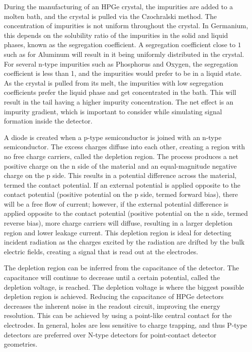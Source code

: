 During the manufacturing of an HPGe crystal, the impurities are added to a molten bath, and the crystal is pulled via the Czochralski method. The concentration of impurities is not uniform throughout the crystal. In Germanium, this depends on the solubility ratio of the impurities in the solid and liquid phases, known as the segregation coefficient. A segregation coefficient close to $1$ such as for Aluminum will result in it being uniformly distributed in the crystal. For several n-type impurities such as Phosphorus and Oxygen, the segregation coefficient is less than 1, and the impurities would prefer to be in a liquid state. As the crystal is pulled from its melt, the impurities with low segregation coefficients prefer the liquid phase and get concentrated in the bath. This will result in the tail having a higher impurity concentration. The net effect is an impurity gradient, which is important to consider while simulating signal formation inside the detector.

A diode is created when a p-type semiconductor is joined with an n-type semiconductor. The excess charges diffuse into each other, creating a region with no free charge carriers, called the depletion region. The process produces a net positive charge on the n side of the material and an equal-magnitude negative charge on the p side. This results in a potential difference across the material, termed the contact potential. If an external potential is applied opposite to the contact potential (positive potential on the p side, termed forward bias), there will be a free flow of current; however, if the external potential difference is applied opposite to the contact potential (positive potential on the n side, termed reverse bias), more charge carriers will diffuse, resulting in a larger depletion region and lower leakage current. This depletion region is ideal for detecting incident radiation as the charges excited by the radiation are drifted by the bulk electric fields, creating a signal that is read out at the electrodes.

The depletion region can be inferred from the capacitance of the detector. The capacitance will continue to decrease until a certain potential, called the depletion voltage, is reached. The depletion voltage is where the biggest possible depletion region is achieved. Reducing the capacitance of HPGe detectors decreases the inherent noise in the readout circuit, improving the energy resolution. This can be achieved by using a point-like central contact for the electrodes. In general, holes are less sensitive to charge trapping, and thus P-type detectors are preferred over N-type detectors for point-contact detector geometries.

